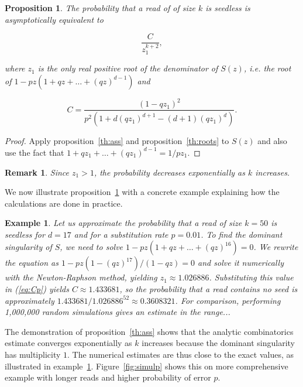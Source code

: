 \documentclass{article}
\newtheorem{example}{Example}
\newtheorem{proposition}{Proposition}
\newtheorem{remark}{Remark}
\begin{document}
\begin{proposition}
\label{th:p}
The probability that a read of of size $k$ is seedless is
asymptotically equivalent to

\begin{equation*}
\frac{C}{z_1^{k+2}},
\end{equation*}

\noindent
where $z_1$ is the only real positive root of the denominator of $S(z)$,
\textit{i.e.} the root of $1-pz(1+qz+\ldots+(qz)^{d-1})$ and

\begin{equation}
\label{eq:Cp}
C =\frac{(1-qz_1)^2}{p^2\left( 1 + d(qz_1)^{d+1} - (d+1)(qz_1)^d
\right)}.
\end{equation}

\end{proposition}

\begin{proof}
Apply proposition~\ref{th:ass} and proposition~\ref{th:roots} to $S(z)$
and also use the fact that $1+qz_1+\ldots+(qz_1)^{d-1} = 1/pz_1$.
\end{proof}

\begin{remark}
Since $z_1 > 1$, the probability decreases exponentially
as $k$ increases.
\end{remark}

We now illustrate proposition~\ref{th:p} with a concrete example
explaining how the calculations are done in practice.

\begin{example}
\label{ex:num}
Let us approximate the probability that a read of size $k=50$ is seedless
for $d=17$ and for a substitution rate $p=0.01$. To find the dominant
singularity of $S$, we need to solve $1-pz(1+qz+\ldots+(qz)^{16}) = 0$.
We rewrite the equation as $1-pz(1-(qz)^{17})/(1-qz) = 0$ and solve
it numerically with the Newton-Raphson method, yielding $z_1 \approx
1.026886$. Substituting this value in (\ref{eq:Cp}) yields $C \approx
1.433681$, so the probability that a read contains no seed is
approximately $1.433681 / 1.026886^{52} \approx 0.3608321$. For
comparison, performing 1,000,000 random simulations gives an estimate in
the range...
\end{example}

The demonstration of proposition~\ref{th:ass} shows that the analytic
combinatorics estimate converges exponentially as $k$ increases because
the dominant singularity has multiplicity $1$. The numerical estimates are
thus close to the exact values, as illustrated in example~\ref{ex:num}.
Figure~\ref{fig:simulp} shows this on more comprehensive example
with longer reads and higher probability of error $p$.
\end{document}
